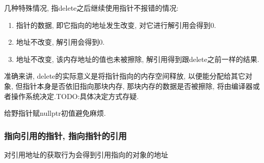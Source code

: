 \noindent 几种特殊情况, 指delete之后继续使用指针不报错的情况:
\begin{enumerate}
	\item 指针的数据, 即它指向的地址发生改变, 对它进行解引用会得到0.
	\item 地址不改变, 解引用会得到0.
	\item 地址不改变, 该内存地址的值也未被擦除, 解引用得到跟delete之前一样的结果.
\end{enumerate}

准确来讲, delete的实际意义是将指针指向的内存空间释放, 以便能分配给其它对象, 但指针本身是否依旧指向那块内存, 
	那块内存的数据是否被擦除, 将由编译器或者操作系统决定.TODO:具体决定方式存疑.

给野指针赋nullptr初值避免麻烦.
\subsubsection{指向引用的指针, 指向指针的引用}
对引用地址的获取行为会得到引用指向的对象的地址

